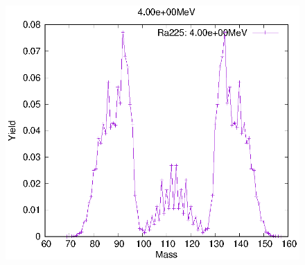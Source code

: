 \begin{figure}[htbp]
\begin{minipage}{0.33\textwidth} \begin{center} \includegraphics[width=\textwidth]{YA/Ra225_4.00e+00.eps} \end{center} \end{minipage}
\end{figure}
